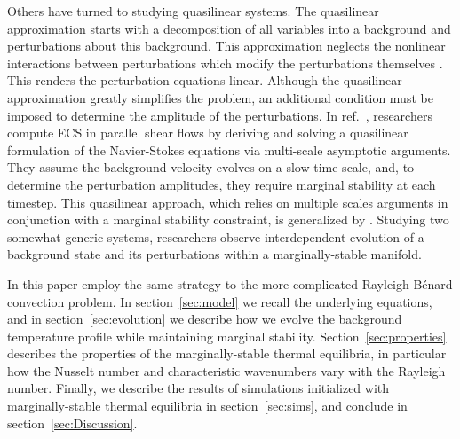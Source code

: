 \documentclass[reprint,amsmath,amssymb,aps,nofootinbib]{revtex4-1}
\renewcommand{\citet}[1]{ref.~\cite{#1}}
\begin{document}
Others have turned to studying quasilinear systems.
The quasilinear approximation starts with a decomposition of all variables into a background and perturbations about this background.
This approximation neglects the nonlinear interactions between perturbations which modify the perturbations themselves \cite{marston2016}.
This renders the perturbation equations linear.
Although the quasilinear approximation greatly simplifies the problem, an additional condition must be imposed to determine the amplitude of the perturbations.
In \citet{Beaume_2015}, researchers compute ECS in parallel shear flows by deriving and solving a quasilinear formulation of the Navier-Stokes equations via multi-scale asymptotic arguments. 
They assume the background velocity evolves on a slow time scale, and, to determine the perturbation amplitudes, they require marginal stability at each timestep.
This quasilinear approach, which relies on multiple scales arguments in conjunction with a marginal stability constraint, is generalized by \cite{Chini_ql}.
Studying two somewhat generic systems, researchers observe interdependent evolution of a background state and its perturbations within a marginally-stable manifold.

In this paper employ the same strategy to the more complicated Rayleigh-B\'{e}nard convection problem.
In section~\ref{sec:model} we recall the underlying equations, and in section~\ref{sec:evolution} we describe how we evolve the background temperature profile while maintaining marginal stability.
Section~\ref{sec:properties} describes the properties of the marginally-stable thermal equilibria, in particular how the Nusselt number and characteristic wavenumbers vary with the Rayleigh number.
Finally, we describe the results of simulations initialized with marginally-stable thermal equilibria in section~\ref{sec:sims}, and conclude in section~\ref{sec:Discussion}.
 
\end{document}
